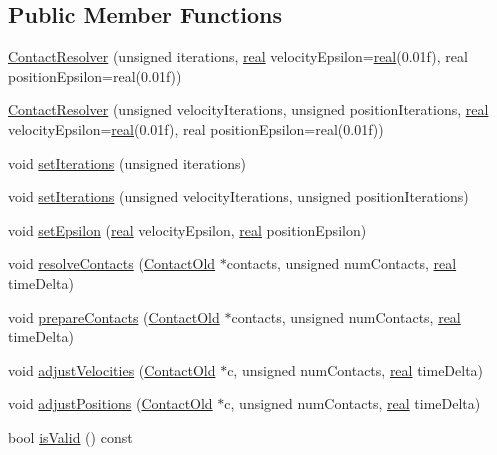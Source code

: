 \subsection*{Public Member Functions}
\begin{DoxyCompactItemize}
\item 
\mbox{\hyperlink{classr3_1_1_contact_resolver_a1728aa5f4a167b00b0c138f6aacf3206}{Contact\+Resolver}} (unsigned iterations, \mbox{\hyperlink{namespacer3_ab2016b3e3f743fb735afce242f0dc1eb}{real}} velocity\+Epsilon=\mbox{\hyperlink{namespacer3_ab2016b3e3f743fb735afce242f0dc1eb}{real}}(0.\+01f), real position\+Epsilon=real(0.\+01f))
\item 
\mbox{\hyperlink{classr3_1_1_contact_resolver_acb2f7f96722326346fbe0e54d05cfdc9}{Contact\+Resolver}} (unsigned velocity\+Iterations, unsigned position\+Iterations, \mbox{\hyperlink{namespacer3_ab2016b3e3f743fb735afce242f0dc1eb}{real}} velocity\+Epsilon=\mbox{\hyperlink{namespacer3_ab2016b3e3f743fb735afce242f0dc1eb}{real}}(0.\+01f), real position\+Epsilon=real(0.\+01f))
\item 
void \mbox{\hyperlink{classr3_1_1_contact_resolver_aba01b66ae9ff4b713b65142466d3f98d}{set\+Iterations}} (unsigned iterations)
\item 
void \mbox{\hyperlink{classr3_1_1_contact_resolver_a661c4b7d7ba2232f16691e159601401f}{set\+Iterations}} (unsigned velocity\+Iterations, unsigned position\+Iterations)
\item 
void \mbox{\hyperlink{classr3_1_1_contact_resolver_a699cd63e020c47c52223efa1494bdfae}{set\+Epsilon}} (\mbox{\hyperlink{namespacer3_ab2016b3e3f743fb735afce242f0dc1eb}{real}} velocity\+Epsilon, \mbox{\hyperlink{namespacer3_ab2016b3e3f743fb735afce242f0dc1eb}{real}} position\+Epsilon)
\item 
void \mbox{\hyperlink{classr3_1_1_contact_resolver_a3ec12f4cbf8b42e1d481a77173b664c1}{resolve\+Contacts}} (\mbox{\hyperlink{classr3_1_1_contact_old}{Contact\+Old}} $\ast$contacts, unsigned num\+Contacts, \mbox{\hyperlink{namespacer3_ab2016b3e3f743fb735afce242f0dc1eb}{real}} time\+Delta)
\item 
void \mbox{\hyperlink{classr3_1_1_contact_resolver_ac791c4cb45b46702014703c54cd97f0f}{prepare\+Contacts}} (\mbox{\hyperlink{classr3_1_1_contact_old}{Contact\+Old}} $\ast$contacts, unsigned num\+Contacts, \mbox{\hyperlink{namespacer3_ab2016b3e3f743fb735afce242f0dc1eb}{real}} time\+Delta)
\item 
void \mbox{\hyperlink{classr3_1_1_contact_resolver_aa5d26e400938482f47fd5efa760ea9d3}{adjust\+Velocities}} (\mbox{\hyperlink{classr3_1_1_contact_old}{Contact\+Old}} $\ast$c, unsigned num\+Contacts, \mbox{\hyperlink{namespacer3_ab2016b3e3f743fb735afce242f0dc1eb}{real}} time\+Delta)
\item 
void \mbox{\hyperlink{classr3_1_1_contact_resolver_a5dc41bad46cf659b93488f7c7db74712}{adjust\+Positions}} (\mbox{\hyperlink{classr3_1_1_contact_old}{Contact\+Old}} $\ast$c, unsigned num\+Contacts, \mbox{\hyperlink{namespacer3_ab2016b3e3f743fb735afce242f0dc1eb}{real}} time\+Delta)
\item 
bool \mbox{\hyperlink{classr3_1_1_contact_resolver_a7864d5856905dfc9b083931c891dddc6}{is\+Valid}} () const
\end{DoxyCompactItemize}
